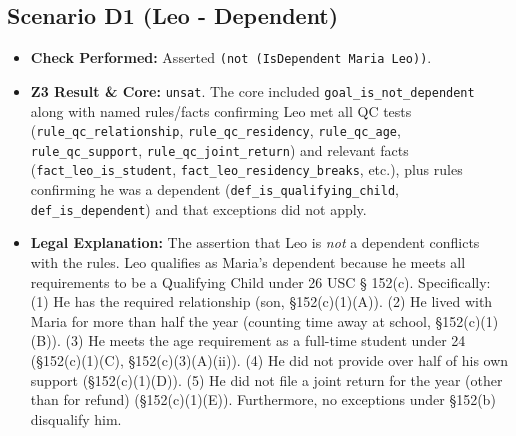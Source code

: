 \documentclass[11pt, letterpaper]{article}
\begin{document}
\subsection{Scenario D1 (Leo - Dependent)}
\begin{itemize}
    \item \textbf{Check Performed:} Asserted \texttt{(not (IsDependent Maria Leo))}.
    \item \textbf{Z3 Result \& Core:} \texttt{unsat}. The core included \texttt{goal\_is\_not\_dependent} along with named rules/facts confirming Leo met all QC tests (\texttt{rule\_qc\_relationship}, \texttt{rule\_qc\_residency}, \texttt{rule\_qc\_age}, \texttt{rule\_qc\_support}, \texttt{rule\_qc\_joint\_return}) and relevant facts (\texttt{fact\_leo\_is\_student}, \texttt{fact\_leo\_residency\_breaks}, etc.), plus rules confirming he was a dependent (\texttt{def\_is\_qualifying\_child}, \texttt{def\_is\_dependent}) and that exceptions did not apply.
    \item \textbf{Legal Explanation:} The assertion that Leo is \textit{not} a dependent conflicts with the rules. Leo qualifies as Maria's dependent because he meets all requirements to be a Qualifying Child under 26 USC § 152(c). Specifically: (1) He has the required relationship (son, §152(c)(1)(A)). (2) He lived with Maria for more than half the year (counting time away at school, §152(c)(1)(B)). (3) He meets the age requirement as a full-time student under 24 (§152(c)(1)(C), §152(c)(3)(A)(ii)). (4) He did not provide over half of his own support (§152(c)(1)(D)). (5) He did not file a joint return for the year (other than for refund) (§152(c)(1)(E)). Furthermore, no exceptions under §152(b) disqualify him.
\end{itemize}
\end{document}
